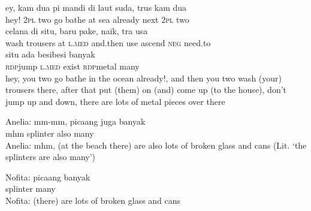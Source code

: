 \ea
\gll   ey,    {kam}    {dua}    {pi}    {mandi}   di    {laut}    {suda,}    {trus}    {kam}   dua\\
  hey!    {\textsc{2pl}}    {two}    {go}    {bathe}   at    {sea}    {already}    {next}    {\textsc{2pl}}   two\\
    {celana}    {di}    {situ,}    {baru}    {pake,}    {naik,}    {tra}    {usa}\\
   {wash}    {trousers}    {at}    {\textsc{l.med}}    {and.then}    {use}    {ascend}    {\textsc{neg}}    {need.to}\\
    {situ}    {ada}    {besi{\Tilde}besi}    {banyak}\\
   {\textsc{rdp}{\Tilde}jump}    {\textsc{l.med}}    {exist}    {\textsc{rdp}{\Tilde}metal}    {many}\\
\glt
hey, you two go bathe in the ocean already!, and then you two wash (your) trousers there, after that put (them) on (and) come up (to the house), don’t jump up and down, there are lots of metal pieces over there
\z

\ea
\gll   Anelia:   mm-mm,   picaang   juga   banyak\\
 {} mhm   splinter   also   many\\
\glt
Anelia: mhm, (at the beach there) are also lots of broken glass and cans (Lit. ‘the splinters are also many’)
\z

\ea
\gll   Nofita:   picaang   banyak\\
{} splinter   many\\
\glt
Nofita: (there) are lots of broken glass and cans
\z %

